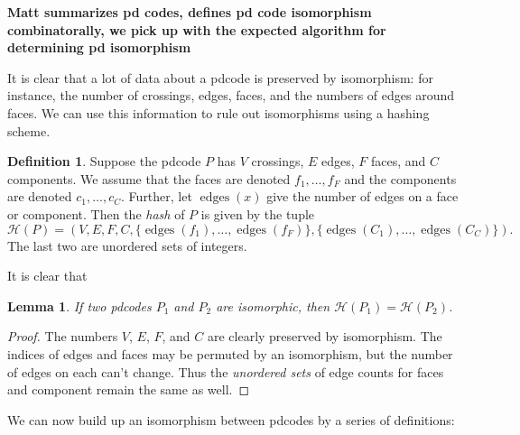 \documentclass[amsmath,secnumarabic,floatfix,amssymb,nofootinbib,nobibnotes,letterpaper,11pt,tightenlines,showkeys]{revtex4}
\newtheorem{lemma}[theorem]{Lemma}
\theoremstyle{definition}
\newtheorem{definition}[theorem]{Definition}
\newcommand{\pdcode}{pdcode }
\newcommand{\pdcodes}{pdcodes }
\newcommand{\edges}{\operatorname{edges}}
\begin{document}
\begin{center}
\textbf{Matt summarizes pd codes, defines pd code isomorphism combinatorally, we pick up with the expected algorithm for determining pd isomorphism}
\end{center}

It is clear that a lot of data about a \pdcode is preserved by isomorphism: for instance, the number of crossings, edges, faces, and the numbers of edges around faces. We can use this information to rule out isomorphisms using a hashing scheme.

\begin{definition}
Suppose the \pdcode $P$ has $V$ crossings, $E$ edges, $F$ faces, and $C$ components. We assume that the faces are denoted $f_1, \dots, f_F$ and the components are denoted $c_1, \dots, c_C$. Further, let $\edges(x)$ give the number of edges on a face or component. Then the \emph{hash} of $P$ is given by the tuple
\begin{equation*}
\mathcal{H}(P) = (V,E,F,C,\{ \edges(f_1), \dots, \edges(f_F) \}, 
 \{ \edges(C_1), \dots, \edges(C_C) \}).
\end{equation*}
The last two are unordered sets of integers.
\end{definition}

It is clear that
\begin{lemma}
If two \pdcodes $P_1$ and $P_2$ are isomorphic, then $\mathcal{H}(P_1) = \mathcal{H}(P_2)$.
\end{lemma}

\begin{proof}
The numbers $V$, $E$, $F$, and $C$ are clearly preserved by isomorphism. The indices of edges and faces may be permuted by an isomorphism, but the number of edges on each can't change. Thus the \emph{unordered sets} of edge counts for faces and component remain the same as well.
\end{proof}

We can now build up an isomorphism between pdcodes by a series of definitions:
\end{document}
